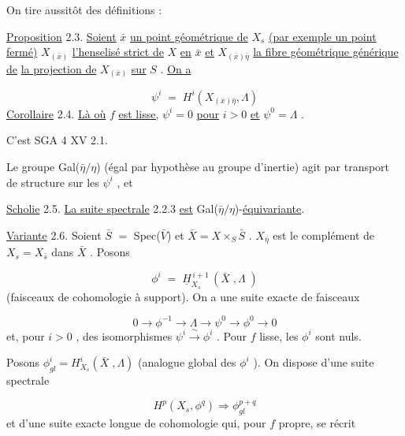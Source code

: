 
On tire aussitôt des définitions :

\underline{Proposition} 2.3.  \underline{Soient}  $\bar{x}$  \underline{un point géométrique de}  $X_s$  \underline{(par exemple un point fermé)} $X_{(\bar{x})}$  \underline{l'henselisé strict de}  $X$  \underline{en}  $\bar{x}$  \underline{et}  $X_{(\bar{x})\bar{\eta}}$   \underline{la fibre géométrique générique de} \underline{la projection de}  $X_{(\bar{x})}$  \underline{sur}  $S$ .  \underline{On a}

\begin{equation*}
\psi^i \;=\; H^i(X_{(\bar{x})\bar{\eta}},\Lambda)
\end{equation*}
\underline{Corollaire} 2.4.  \underline{Là où}  $f$  \underline{est lisse,}  $\psi^i = 0$  \underline{pour}  $i > 0$  \underline{et}  $\psi^{0} = \Lambda$ .

C'est SGA 4 XV 2.1.

Le groupe  Gal($\bar{\eta}/\eta$)  (égal par hypothèse au groupe d'inertie) agit par transport de structure sur les   $\psi^i$ , et

\underline{Scholie} 2.5.  \underline{La suite spectrale} 2.2.3 \underline{est}  Gal($\bar{\eta}/\eta$)-\underline{équivariante}.

\underline{Variante} 2.6.  Soient  $\bar{S}$ $=$ Spec($\bar{V}$)  et  $\bar{X} = X \times_S \bar{S}$ .  $X_{\bar{\eta}}$  est le complément de $X_s = X_{\bar{s}}$  dans  $\bar{X}$ . Posons

\begin{equation*}
\phi^i \;=\; \underline{H}^{\,i+1}_{X_s}\,(\bar{X}\;,\Lambda\;)
\end{equation*}
(faisceaux de cohomologie à support). On a une suite exacte de faisceaux

\begin{equation*}
0 \longrightarrow \phi^{-1} \longrightarrow \Lambda \longrightarrow \psi^{0} \longrightarrow \phi^{0} \longrightarrow 0
\end{equation*}
et, pour  $i > 0$ , des isomorphismes  $\psi^i \xrightarrow{\ \sim\ } \phi^i$ . Pour  $f$  lisse, les  $\phi^i$  sont nuls.

Posons  $\phi^i_{gl} = H^i_{X_s}(\bar{X}\;,\Lambda)$  (analogue global des  $\phi^i$ ). On dispose d'une suite spectrale

\begin{equation*}\tag{2.6.1}
H^p(X_s,\phi^q) \Longrightarrow \phi^{p+q}_{gl}
\end{equation*}
et d'une suite exacte longue de cohomologie qui, pour  $f$  propre, se récrit

